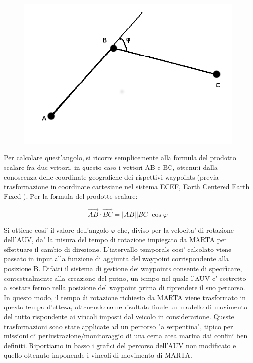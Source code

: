 \begin{figure}[H]
    \centering
	\includegraphics[scale=0.5]{scalarprod.png}
\end{figure}

Per calcolare quest'angolo, si ricorre semplicemente alla formula del prodotto scalare fra due vettori, in questo caso i vettori AB e BC, ottenuti dalla conoscenza delle coordinate geografiche dei rispettivi waypoints (previa trasformazione in coordinate cartesiane nel sistema ECEF, Earth Centered Earth Fixed ). Per la formula del prodotto scalare:


\begin{equation}
\overrightarrow{AB} \cdot \overrightarrow{BC} = |AB| |BC| \cos{\varphi}    
\end{equation}

 
Si ottiene cosi' il valore dell'angolo $\varphi$ che, diviso per la velocita' di rotazione dell'AUV, da' la misura del tempo di rotazione impiegato da MARTA per effettuare il cambio di direzione. \newline L'intervallo temporale cosi' calcolato viene passato in input alla funzione di aggiunta del waypoint corrispondente alla posizione B.
 Difatti il sistema di gestione dei waypoints consente di specificare, contestualmente alla creazione del putno, un tempo nel quale l'AUV e' costretto a sostare fermo nella posizione del waypoint prima di riprendere il suo percorso. In questo modo, il tempo di rotazione richiesto da MARTA viene trasformato in questo tempo d'attesa, ottenendo come risultato finale un modello di movimento del tutto rispondente ai vincoli imposti dal veicolo in considerazione.\newline
Queste trasformazioni sono state applicate ad un percorso "a serpentina", tipico per missioni di perlustrazione/monitoraggio di una certa area marina dai confini ben definiti. Riportiamo in basso i grafici del percorso dell'AUV non modificato e quello ottenuto imponendo i vincoli di movimento di MARTA.


